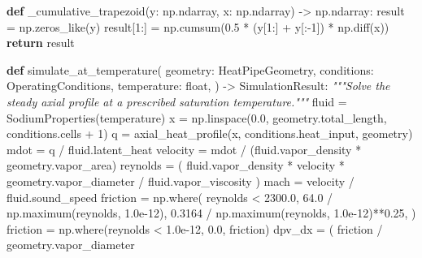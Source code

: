 \documentclass[
  12pt,
  12pt,a4paper,oneside]{report}
\newenvironment{Shaded}{}{}
\newcommand{\BuiltInTok}[1]{\textcolor[rgb]{0.00,0.50,0.00}{#1}}
\newcommand{\CommentTok}[1]{\textcolor[rgb]{0.38,0.63,0.69}{\textit{#1}}}
\newcommand{\ControlFlowTok}[1]{\textcolor[rgb]{0.00,0.44,0.13}{\textbf{#1}}}
\newcommand{\DecValTok}[1]{\textcolor[rgb]{0.25,0.63,0.44}{#1}}
\newcommand{\FloatTok}[1]{\textcolor[rgb]{0.25,0.63,0.44}{#1}}
\newcommand{\KeywordTok}[1]{\textcolor[rgb]{0.00,0.44,0.13}{\textbf{#1}}}
\newcommand{\NormalTok}[1]{#1}
\newcommand{\OperatorTok}[1]{\textcolor[rgb]{0.40,0.40,0.40}{#1}}
\begin{document}
\begin{Shaded}
\begin{Highlighting}[]
\KeywordTok{def}\NormalTok{ \_cumulative\_trapezoid(y: np.ndarray, x: np.ndarray) }\OperatorTok{{-}\textgreater{}}\NormalTok{ np.ndarray:}
\NormalTok{    result }\OperatorTok{=}\NormalTok{ np.zeros\_like(y)}
\NormalTok{    result[}\DecValTok{1}\NormalTok{:] }\OperatorTok{=}\NormalTok{ np.cumsum(}\FloatTok{0.5} \OperatorTok{*}\NormalTok{ (y[}\DecValTok{1}\NormalTok{:] }\OperatorTok{+}\NormalTok{ y[:}\OperatorTok{{-}}\DecValTok{1}\NormalTok{]) }\OperatorTok{*}\NormalTok{ np.diff(x))}
    \ControlFlowTok{return}\NormalTok{ result}


\KeywordTok{def}\NormalTok{ simulate\_at\_temperature(}
\NormalTok{    geometry: HeatPipeGeometry,}
\NormalTok{    conditions: OperatingConditions,}
\NormalTok{    temperature: }\BuiltInTok{float}\NormalTok{,}
\NormalTok{) }\OperatorTok{{-}\textgreater{}}\NormalTok{ SimulationResult:}
    \CommentTok{"""Solve the steady axial profile at a prescribed saturation temperature."""}
\NormalTok{    fluid }\OperatorTok{=}\NormalTok{ SodiumProperties(temperature)}
\NormalTok{    x }\OperatorTok{=}\NormalTok{ np.linspace(}\FloatTok{0.0}\NormalTok{, geometry.total\_length, conditions.cells }\OperatorTok{+} \DecValTok{1}\NormalTok{)}
\NormalTok{    q }\OperatorTok{=}\NormalTok{ axial\_heat\_profile(x, conditions.heat\_input, geometry)}
\NormalTok{    mdot }\OperatorTok{=}\NormalTok{ q }\OperatorTok{/}\NormalTok{ fluid.latent\_heat}
\NormalTok{    velocity }\OperatorTok{=}\NormalTok{ mdot }\OperatorTok{/}\NormalTok{ (fluid.vapor\_density }\OperatorTok{*}\NormalTok{ geometry.vapor\_area)}
\NormalTok{    reynolds }\OperatorTok{=}\NormalTok{ (}
\NormalTok{        fluid.vapor\_density }\OperatorTok{*}\NormalTok{ velocity }\OperatorTok{*}\NormalTok{ geometry.vapor\_diameter}
        \OperatorTok{/}\NormalTok{ fluid.vapor\_viscosity}
\NormalTok{    )}
\NormalTok{    mach }\OperatorTok{=}\NormalTok{ velocity }\OperatorTok{/}\NormalTok{ fluid.sound\_speed}
\NormalTok{    friction }\OperatorTok{=}\NormalTok{ np.where(}
\NormalTok{        reynolds }\OperatorTok{\textless{}} \FloatTok{2300.0}\NormalTok{,}
        \FloatTok{64.0} \OperatorTok{/}\NormalTok{ np.maximum(reynolds, }\FloatTok{1.0e{-}12}\NormalTok{),}
        \FloatTok{0.3164} \OperatorTok{/}\NormalTok{ np.maximum(reynolds, }\FloatTok{1.0e{-}12}\NormalTok{)}\OperatorTok{**}\FloatTok{0.25}\NormalTok{,}
\NormalTok{    )}
\NormalTok{    friction }\OperatorTok{=}\NormalTok{ np.where(reynolds }\OperatorTok{\textless{}} \FloatTok{1.0e{-}12}\NormalTok{, }\FloatTok{0.0}\NormalTok{, friction)}
\NormalTok{    dpv\_dx }\OperatorTok{=}\NormalTok{ (}
\NormalTok{        friction }\OperatorTok{/}\NormalTok{ geometry.vapor\_diameter}

\end{Highlighting}
\end{Shaded}
\end{document}
